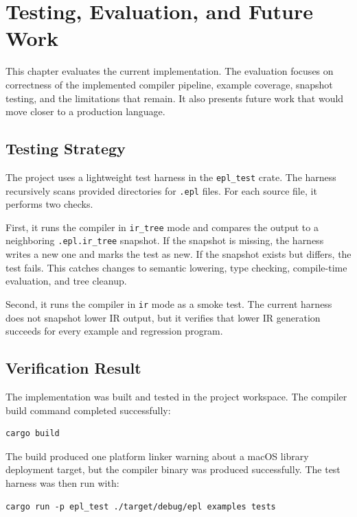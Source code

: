 \chapter{Testing, Evaluation, and Future Work}
\label{chap:testing}
\label{chap:conclusion}

This chapter evaluates the current implementation. The evaluation focuses on
correctness of the implemented compiler pipeline, example coverage, snapshot
testing, and the limitations that remain. It also presents future work that
would move \epl{} closer to a production language.

\section{Testing Strategy}

The project uses a lightweight test harness in the \texttt{epl\_test} crate. The
harness recursively scans provided directories for \texttt{.epl} files. For each
source file, it performs two checks.

First, it runs the compiler in \texttt{ir\_tree} mode and compares the output to
a neighboring \texttt{.epl.ir\_tree} snapshot. If the snapshot is missing, the
harness writes a new one and marks the test as new. If the snapshot exists but
differs, the test fails. This catches changes to semantic lowering, type
checking, compile-time evaluation, and tree cleanup.

Second, it runs the compiler in \texttt{ir} mode as a smoke test. The current
harness does not snapshot lower IR output, but it verifies that lower IR
generation succeeds for every example and regression program.

\section{Verification Result}

The implementation was built and tested in the project workspace. The compiler
build command completed successfully:

\begin{lstlisting}[caption={Compiler build command}]
cargo build
\end{lstlisting}

The build produced one platform linker warning about a macOS library deployment
target, but the compiler binary was produced successfully. The test harness was
then run with:

\begin{lstlisting}[caption={Test harness command}]
cargo run -p epl_test ./target/debug/epl examples tests
\end{lstlisting}

